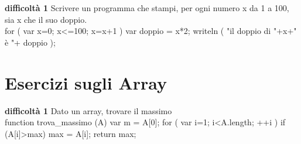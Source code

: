\documentclass{article}
\newenvironment{solution}{\verbatim}{\endverbatim}
\newenvironment{exercise}[3]{%
\noindent \textbf{\footnotesize difficoltà #2}
#3 \\
}{}
\begin{document}
\begin{exercise}{for}{1}{Scrivere un programma che stampi, per ogni numero x da 1 a 100, sia x che il suo doppio.}
\begin{solution}
for ( var x=0; x<=100; x=x+1 )
{
    var doppio = x*2;
    writeln ( "il doppio di "+x+" è "+ doppio );
}
\end{solution}
\end{exercise}


\section{Esercizi sugli Array}


\begin{exercise}{array}{1}{Dato un array, trovare il massimo}
\begin{solution}
function trova_massimo (A)
{
    var m = A[0];
    for ( var i=1; i<A.length; ++i )
    {
        if (A[i]>max)
        {
            max = A[i];
        }
    }
    return max;
}
\end{solution}
\end{exercise}
\end{document}
